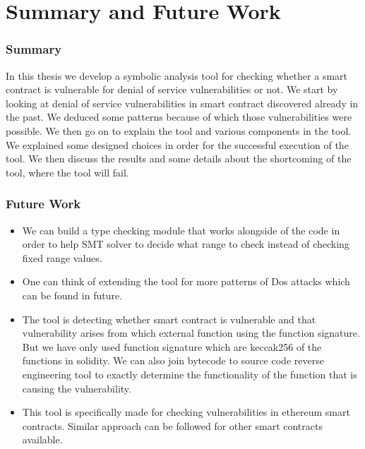 \chapter{Summary and Future Work}
\label{ch:conclusion}
\subsection*{Summary}
In this thesis we develop a symbolic analysis tool for checking whether a smart contract is vulnerable for denial of service vulnerabilities or not. We start by looking at denial of service vulnerabilities in smart contract discovered already in the past. We deduced some patterns because of which those vulnerabilities were possible. We then go on to explain the tool and various components in the tool. We explained some designed choices in order for the successful execution of the tool. We then discuss the results and some details about the shortcoming of the tool, where the tool will fail. \\
\subsection*{Future Work}
\begin{itemize}
    \item We can build a type checking\cite{typechecking} module that works alongside of the code in order to help SMT solver to decide what range to check instead of checking fixed range values.
    \item One can think of extending the tool for more patterns of Dos attacks which can be found in future.
    \item The tool is detecting whether smart contract is vulnerable and that vulnerability arises from which external function using the function signature. But we have only used function signature which are keccak256 of the functions in solidity. We can also join bytecode to source code reverse engineering\cite{217583} tool\cite{erays} to exactly determine the functionality of the function that is causing the vulnerability.
    \item This tool is specifically made for checking vulnerabilities in ethereum smart contracts. Similar approach can be followed for other smart contracts available. 
\end{itemize}